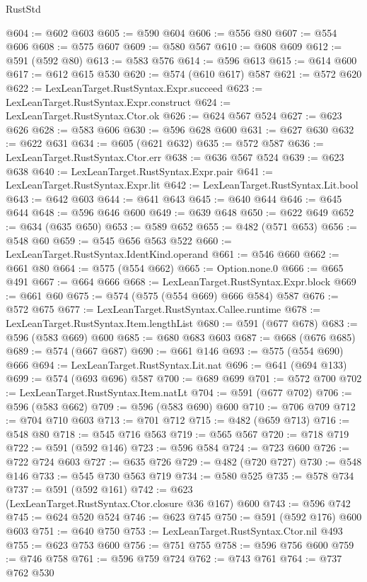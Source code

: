 \begin{lexlean}{RustStd}
\begin{coremodule}
@604 := @602 @603
@605 := @590 @604
@606 := @556 @80
@607 := @554 @606
@608 := @575 @607
@609 := @580 @567
@610 := @608 @609
@612 := @591 (@592 @80)
@613 := @583 @576
@614 := @596 @613
@615 := @614 @600
@617 := @612 @615 @530
@620 := @574 (@610 @617) @587
@621 := @572 @620
@622 := LexLeanTarget.RustSyntax.Expr.succeed
@623 := LexLeanTarget.RustSyntax.Expr.construct
@624 := LexLeanTarget.RustSyntax.Ctor.ok
@626 := @624 @567 @524
@627 := @623 @626
@628 := @583 @606
@630 := @596 @628 @600
@631 := @627 @630
@632 := @622 @631
@634 := @605 (@621 @632)
@635 := @572 @587
@636 := LexLeanTarget.RustSyntax.Ctor.err
@638 := @636 @567 @524
@639 := @623 @638
@640 := LexLeanTarget.RustSyntax.Expr.pair
@641 := LexLeanTarget.RustSyntax.Expr.lit
@642 := LexLeanTarget.RustSyntax.Lit.bool
@643 := @642 @603
@644 := @641 @643
@645 := @640 @644
@646 := @645 @644
@648 := @596 @646 @600
@649 := @639 @648
@650 := @622 @649
@652 := @634 (@635 @650)
@653 := @589 @652
@655 := @482 (@571 @653)
@656 := @548 @60
@659 := @545 @656 @563 @522
@660 := LexLeanTarget.RustSyntax.IdentKind.operand
@661 := @546 @660
@662 := @661 @80
@664 := @575 (@554 @662)
@665 := Option.none.{0}
@666 := @665 @491
@667 := @664 @666
@668 := LexLeanTarget.RustSyntax.Expr.block
@669 := @661 @60
@675 := @574 (@575 (@554 @669) @666 @584) @587
@676 := @572 @675
@677 := LexLeanTarget.RustSyntax.Callee.runtime
@678 := LexLeanTarget.RustSyntax.Item.lengthList
@680 := @591 (@677 @678)
@683 := @596 (@583 @669) @600
@685 := @680 @683 @603
@687 := @668 (@676 @685)
@689 := @574 (@667 @687)
@690 := @661 @146
@693 := @575 (@554 @690) @666
@694 := LexLeanTarget.RustSyntax.Lit.nat
@696 := @641 (@694 @133)
@699 := @574 (@693 @696) @587
@700 := @689 @699
@701 := @572 @700
@702 := LexLeanTarget.RustSyntax.Item.natLt
@704 := @591 (@677 @702)
@706 := @596 (@583 @662)
@709 := @596 (@583 @690) @600
@710 := @706 @709
@712 := @704 @710 @603
@713 := @701 @712
@715 := @482 (@659 @713)
@716 := @548 @80
@718 := @545 @716 @563
@719 := @565 @567
@720 := @718 @719
@722 := @591 (@592 @146)
@723 := @596 @584
@724 := @723 @600
@726 := @722 @724 @603
@727 := @635 @726
@729 := @482 (@720 @727)
@730 := @548 @146
@733 := @545 @730 @563 @719
@734 := @580 @525
@735 := @578 @734
@737 := @591 (@592 @161)
@742 := @623 (LexLeanTarget.RustSyntax.Ctor.closure @36 @167) @600
@743 := @596 @742
@745 := @624 @520 @524
@746 := @623 @745
@750 := @591 (@592 @176) @600 @603
@751 := @640 @750
@753 := LexLeanTarget.RustSyntax.Ctor.nil @493
@755 := @623 @753 @600
@756 := @751 @755
@758 := @596 @756 @600
@759 := @746 @758
@761 := @596 @759 @724
@762 := @743 @761
@764 := @737 @762 @530

\end{coremodule}
\end{lexlean}
